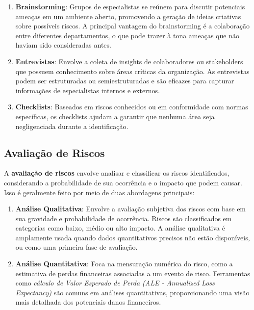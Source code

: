 \documentclass[12pt,oneside,a4paper,article]{abntex2}
\begin{document}
\begin{enumerate}
    \item \textbf{Brainstorming}: Grupos de especialistas se reúnem para discutir potenciais ameaças em um ambiente aberto, promovendo a geração de ideias criativas sobre possíveis riscos. A principal vantagem do brainstorming é a colaboração entre diferentes departamentos, o que pode trazer à tona ameaças que não haviam sido consideradas antes.
    
    \item \textbf{Entrevistas}: Envolve a coleta de insights de colaboradores ou stakeholders que possuem conhecimento sobre áreas críticas da organização. As entrevistas podem ser estruturadas ou semiestruturadas e são eficazes para capturar informações de especialistas internos e externos.
    
    \item \textbf{Checklists}: Baseados em riscos conhecidos ou em conformidade com normas específicas, os checklists ajudam a garantir que nenhuma área seja negligenciada durante a identificação.
\end{enumerate}

\subsection{Avaliação de Riscos}

A \textbf{avaliação de riscos} envolve analisar e classificar os riscos identificados, considerando a probabilidade de sua ocorrência e o impacto que podem causar. Isso é geralmente feito por meio de duas abordagens principais:

\begin{enumerate}
    \item \textbf{Análise Qualitativa}: Envolve a avaliação subjetiva dos riscos com base em sua gravidade e probabilidade de ocorrência. Riscos são classificados em categorias como baixo, médio ou alto impacto. A análise qualitativa é amplamente usada quando dados quantitativos precisos não estão disponíveis, ou como uma primeira fase de avaliação.
    
    \item \textbf{Análise Quantitativa}: Foca na mensuração numérica do risco, como a estimativa de perdas financeiras associadas a um evento de risco. Ferramentas como \textit{cálculo de Valor Esperado de Perda (ALE - Annualized Loss Expectancy)} são comuns em análises quantitativas, proporcionando uma visão mais detalhada dos potenciais danos financeiros.
\end{enumerate}
\end{document}
